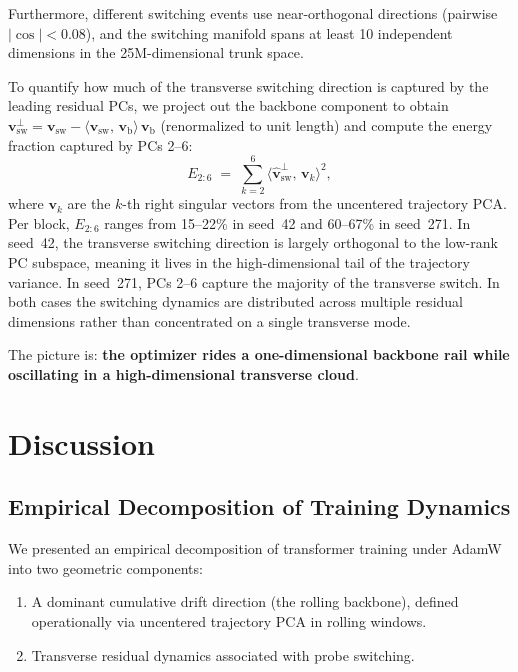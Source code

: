 \documentclass[11pt,a4paper]{article}
\newcommand{\vb}{\mathbf{v}_{\mathrm{b}}}
\newcommand{\vswitch}{\mathbf{v}_{\mathrm{sw}}}
\newcommand{\inner}[2]{\langle #1,\, #2 \rangle}
\newcommand{\abs}[1]{\lvert #1 \rvert}
\begin{document}
Furthermore, different switching events use near-orthogonal directions (pairwise
$\abs{\cos} < 0.08$), and the switching manifold spans at least 10 independent
dimensions in the 25M-dimensional trunk space.

To quantify how much of the transverse switching direction is captured by the
leading residual PCs, we project out the backbone component to obtain
$\vswitch^{\perp} = \vswitch - \inner{\vswitch}{\vb}\,\vb$ (renormalized to
unit length) and compute the energy fraction captured by PCs 2--6:
\begin{equation}\label{eq:resid-capture}
    E_{2{:}6} \;=\; \sum_{k=2}^{6}
    \inner{\hat{\mathbf{v}}_{\mathrm{sw}}^{\perp}}{\mathbf{v}_k}^2,
\end{equation}
where $\mathbf{v}_k$ are the $k$-th right singular vectors from the uncentered
trajectory PCA.  Per block, $E_{2{:}6}$ ranges from 15--22\% in seed~42 and
60--67\% in seed~271.  In seed~42, the transverse switching direction is
largely orthogonal to the low-rank PC subspace, meaning it lives in the
high-dimensional tail of the trajectory variance.  In seed~271, PCs 2--6
capture the majority of the transverse switch.  In both cases the switching
dynamics are distributed across multiple residual dimensions rather than
concentrated on a single transverse mode.

The picture is: \textbf{the optimizer rides a one-dimensional backbone rail
while oscillating in a high-dimensional transverse cloud}.


\section{Discussion}\label{sec:discussion}


\subsection{Empirical Decomposition of Training Dynamics}

We presented an empirical decomposition of transformer training under AdamW into two geometric components:

\begin{enumerate}
\item A dominant cumulative drift direction (the rolling backbone), defined operationally via uncentered trajectory PCA in rolling windows.
\item Transverse residual dynamics associated with probe switching.
\end{enumerate}
\end{document}
